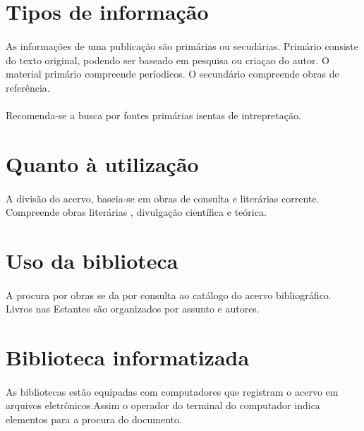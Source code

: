 \section{Tipos de informação}

\paragraph{}

As informações de uma publicação são primárias ou secudárias.
Primário consiste do texto original, podendo ser baseado em pesquisa ou criaçao do autor. O material primário compreende períodicos. O secundário compreende obras de referência.

\paragraph{}

Recomenda-se a busca por fontes primárias isentas de intrepretação.

\section{Quanto à utilização}

\paragraph{}

A divisão do acervo, baseia-se em obras de consulta e literárias corrente. Compreende obras literárias , divulgação científica e teórica.

\section{Uso da biblioteca}

\paragraph{}

A procura por obras se da por consulta ao catálogo do acervo bibliográfico.
Livros nas Estantes são organizados por assunto e autores.

\section{Biblioteca informatizada}

\paragraph{}

As bibliotecas estão equipadas com computadores que registram o acervo em arquivos eletrônicos.Assim o operador do terminal do computador indica elementos para a procura do documento. 






 
 
 